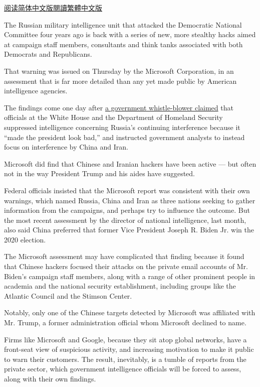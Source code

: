 \href{https://cn.nytimes3xbfgragh.onion/usa/20200911/microsoft-election-hacking/}{阅读简体中文版}\href{https://cn.nytimes3xbfgragh.onion/usa/20200911/microsoft-election-hacking/zh-hant/}{閱讀繁體中文版}

The Russian military intelligence unit that attacked the Democratic
National Committee four years ago is back with a series of new, more
stealthy hacks aimed at campaign staff members, consultants and think
tanks associated with both Democrats and Republicans.

That warning was issued on Thursday by the Microsoft Corporation, in an
assessment that is far more detailed than any yet made public by
American intelligence agencies.

The findings come one day after
\href{https://www.nytimes3xbfgragh.onion/2020/09/09/us/politics/homeland-security-russia-trump.html}{a
government whistle-blower claimed} that officials at the White House and
the Department of Homeland Security suppressed intelligence concerning
Russia's continuing interference because it ``made the president look
bad,'' and instructed government analysts to instead focus on
interference by China and Iran.

Microsoft did find that Chinese and Iranian hackers have been active ---
but often not in the way President Trump and his aides have suggested.

Federal officials insisted that the Microsoft report was consistent with
their own warnings, which named Russia, China and Iran as three nations
seeking to gather information from the campaigns, and perhaps try to
influence the outcome. But the most recent assessment by the director of
national intelligence, last month, also said China preferred that former
Vice President Joseph R. Biden Jr. win the 2020 election.

The Microsoft assessment may have complicated that finding because it
found that Chinese hackers focused their attacks on the private email
accounts of Mr. Biden's campaign staff members, along with a range of
other prominent people in academia and the national security
establishment, including groups like the Atlantic Council and the
Stimson Center.

Notably, only one of the Chinese targets detected by Microsoft was
affiliated with Mr. Trump, a former administration official whom
Microsoft declined to name.

Firms like Microsoft and Google, because they sit atop global networks,
have a front-seat view of suspicious activity, and increasing motivation
to make it public to warn their customers. The result, inevitably, is a
tumble of reports from the private sector, which government intelligence
officials will be forced to assess, along with their own findings.

